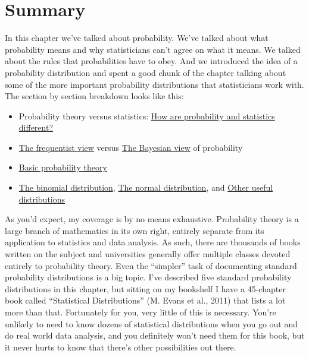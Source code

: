 \documentclass[
  letterpaper,
]{book}
\providecommand{\tightlist}{%
  \setlength{\itemsep}{0pt}\setlength{\parskip}{0pt}}\usepackage{longtable,booktabs,array}
\begin{document}
\hypertarget{summary-2}{%
\section{Summary}\label{summary-2}}

In this chapter we've talked about probability. We've talked about what
probability means and why statisticians can't agree on what it means. We
talked about the rules that probabilities have to obey. And we
introduced the idea of a probability distribution and spent a good chunk
of the chapter talking about some of the more important probability
distributions that statisticians work with. The section by section
breakdown looks like this:

\begin{itemize}
\tightlist
\item
  Probability theory versus statistics:
  \protect\hyperlink{how-are-probability-and-statistics-different}{How
  are probability and statistics different?}
\item
  \protect\hyperlink{the-frequentist-view}{The frequentist view} versus
  \protect\hyperlink{the-bayesian-view}{The Bayesian view} of
  probability
\item
  \protect\hyperlink{basic-probability-theory}{Basic probability theory}
\item
  \protect\hyperlink{sec-The-binomial-distribution}{The binomial
  distribution}, \protect\hyperlink{sec-The-normal-distribution}{The
  normal distribution}, and
  \protect\hyperlink{sec-Other-useful-distributions}{Other useful
  distributions}
\end{itemize}

As you'd expect, my coverage is by no means exhaustive. Probability
theory is a large branch of mathematics in its own right, entirely
separate from its application to statistics and data analysis. As such,
there are thousands of books written on the subject and universities
generally offer multiple classes devoted entirely to probability theory.
Even the ``simpler'' task of documenting standard probability
distributions is a big topic. I've described five standard probability
distributions in this chapter, but sitting on my bookshelf I have a
45-chapter book called ``Statistical Distributions'' (M. Evans et al.,
2011) that lists a lot more than that. Fortunately for you, very little
of this is necessary. You're unlikely to need to know dozens of
statistical distributions when you go out and do real world data
analysis, and you definitely won't need them for this book, but it never
hurts to know that there's other possibilities out there.
\end{document}
